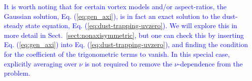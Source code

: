 \documentclass[apj]{emulateapj}
\newcommand{\pderiv}[2]{\frac{\partial #1}{\partial #2}}
\newcommand{\pderivn}[3]{\frac{\partial^{#3} #1}{\partial #2^{#3}}}
\renewcommand{\v}[1]{{\boldsymbol{#1}}} %
\def\blue#1{\textcolor{blue}{#1}}
\def\red#1{\textcolor{red}{#1}}
\newcommand{\del}{\v{\nabla}}
\newcommand{\grad}{\del}
\newcommand{\Laplace}{\nabla^2}
\newcommand{\Eq}[1]{Eq. (\ref{#1})}
\newcommand{\eq}[1]{\Eq{#1}}
\newcommand{\sect}[1]{Sect.~\ref{#1}}
\newcommand{\beq}{\begin{equation}}
\newcommand{\eeq}{\end{equation}}
\newcommand{\epsp}{\xi_{_{+}}}
\begin{document}
\blue{It is worth noting that for certain vortex models and/or
aspect-ratios, the Gaussian solution, \eq{eq:gen_axi}, is in fact an 
exact solution to the dust-steady state equation, \eq{eq:dust-trapping-uvzero}.  
We will explore this in more detail  in \sect{sect:nonaxisymmetric}, but one can check this by inserting
\eq{eq:gen_axi} into \eq{eq:dust-trapping-uvzero}, and finding the condition 
for the coefficient of the trigonometric terms to vanish. 
In this special case, explicitly averaging over $\nu$ is not
required to remove the $\nu$-dependence from the 
problem. 
} 

\end{document}
